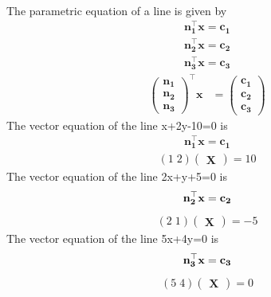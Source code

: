 \documentclass[journal,12pt,twocolumn]{article}
\let\vec\mathbf
\newcommand{\myvec}[1]{\ensuremath{\begin{pmatrix}#1\end{pmatrix}}}
\begin{document}
\\The parametric equation of a line  is given by  
\begin{align}
	\vec{n_1^{\top}}\vec{x}= \vec{c_1}
\end{align}\vspace{2mm}
\begin{align}
	\vec{n_2^{\top}}\vec{x}= \vec{c_2}
\end{align}\vspace{2mm}
\begin{align}
	\vec{n_3^{\top}}\vec{x}= \vec{c_3}
\end{align}\vspace{2mm}
\begin{align}   
	\myvec{\vec{n_1}\\\vec{n_2}\\\vec{n_3}}^{\top}\vec{x} &= \myvec{\vec{c_1}\\\vec{c_2}\\\vec{c_3}}
\end{align} \vspace{2mm}
The vector equation of the line x+2y-10=0  is
\begin{align}
	\vec{n_1^{\top}}\vec{x}= \vec{c_1}
\end{align}\vspace{2mm}
\begin{eqnarray}
(1\;2)\myvec{\vec{X}}=10
\end{eqnarray}
The vector equation of the line 2x+y+5=0  is
\begin{eqnarray}
\begin{align}
	\vec{n_2^{\top}}\vec{x}= \vec{c_2}
\end{align}  \vspace{2mm}
\end{eqnarray}
\begin{eqnarray}
 (2\;1)\myvec{\vec{X}}= -5
\end{eqnarray}
The vector equation of the line 5x+4y=0  is
\begin{eqnarray}
\begin{align}
	\vec{n_3^{\top}}\vec{x}= \vec{c_3}
\end{align}  \vspace{2mm}
\end{eqnarray}
\begin{eqnarray}
 (5\;4)\myvec{\vec{X}}= 0
\end{eqnarray}
\end{document}

